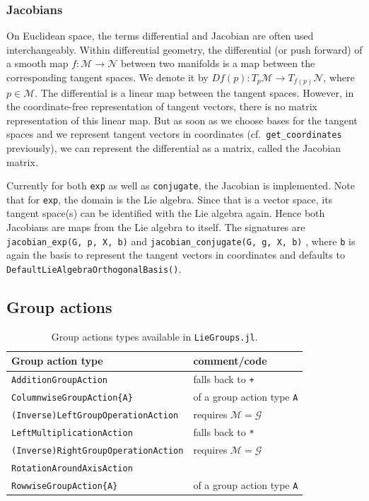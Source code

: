 \documentclass{juliacon}
\begin{document}
\subsubsection*{Jacobians}
On Euclidean space, the terms differential and Jacobian are often used interchangeably. Within differential geometry, the differential (or push forward) of a smooth map $f\colon \mathcal M \to \mathcal N$ between two manifolds is a map between the corresponding tangent spaces. We denote it by $Df(p)\colon T_p\mathcal M \to T_{f(p)}\mathcal N$, where $p \in \mathcal M$.
The differential is a linear map between the tangent spaces.
However, in the coordinate-free representation of tangent vectors, there is no matrix representation of this linear map.
But as soon as we choose bases for the tangent spaces and we represent tangent vectors in coordinates (cf.~\verb|get_coordinates| previously), we can represent the differential as a matrix, called the Jacobian matrix.

Currently for both \verb|exp| as well as \verb|conjugate|, the Jacobian is implemented. Note that for \verb|exp|, the domain is the Lie algebra. Since that is a vector space, its tangent space(s) can be identified with the Lie algebra again. Hence both Jacobians are maps from the Lie algebra to itself. The signatures are
\verb|jacobian_exp(G, p, X, b)|
and \verb|jacobian_conjugate(G, g, X, b)|%
, where \verb|b| is again the basis to represent the tangent vectors in coordinates and defaults to \verb|DefaultLieAlgebraOrthogonalBasis()|.

\subsection{Group actions}

\begin{table}
    \centering
    \caption{Group actions types available in \texttt{LieGroups.jl}.}
    \begin{tabular}{@{}ll@{}}
        \toprule
        \textbf{Group action type} & comment/code\\
        \midrule
        \verb|AdditionGroupAction| & falls back to \verb|+|\\
        \verb|ColumnwiseGroupAction{A}| & of a group action type \verb|A|\\
        \verb|(Inverse)LeftGroupOperationAction| & requires $\mathcal M = \mathcal G$\\
        \verb|LeftMultiplicationAction| & falls back to \verb|*|\\
        \verb|(Inverse)RightGroupOperationAction| & requires $\mathcal M = \mathcal G$\\
        \verb|RotationAroundAxisAction| & \\
        \verb|RowwiseGroupAction{A}| & of a group action type \verb|A|\\
        \bottomrule
    \end{tabular}
    \label{tab:GroupActionTypes}
\end{table}
\end{document}
